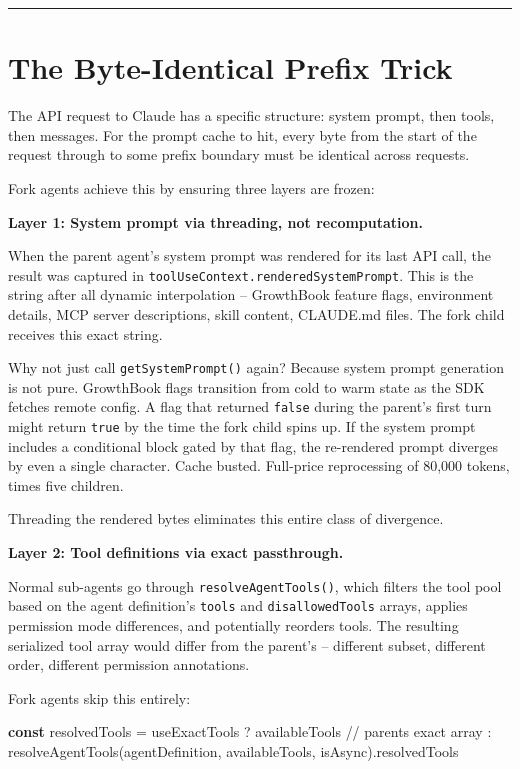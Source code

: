 \documentclass[
  english,
  11pt,
  letterpaper,
]{book}
\newenvironment{Shaded}{\begin{snugshade}}{\end{snugshade}}
\newcommand{\AttributeTok}[1]{\textcolor[rgb]{0.40,0.45,0.13}{#1}}
\newcommand{\CommentTok}[1]{\textcolor[rgb]{0.37,0.37,0.37}{#1}}
\newcommand{\FunctionTok}[1]{\textcolor[rgb]{0.28,0.35,0.67}{#1}}
\newcommand{\KeywordTok}[1]{\textcolor[rgb]{0.00,0.23,0.31}{\textbf{#1}}}
\newcommand{\NormalTok}[1]{\textcolor[rgb]{0.00,0.23,0.31}{#1}}
\newcommand{\OperatorTok}[1]{\textcolor[rgb]{0.37,0.37,0.37}{#1}}
\begin{document}
\begin{center}\rule{0.5\linewidth}{0.5pt}\end{center}

\section{The Byte-Identical Prefix
Trick}\label{the-byte-identical-prefix-trick}

The API request to Claude has a specific structure: system prompt, then
tools, then messages. For the prompt cache to hit, every byte from the
start of the request through to some prefix boundary must be identical
across requests.

Fork agents achieve this by ensuring three layers are frozen:

\textbf{Layer 1: System prompt via threading, not recomputation.}

When the parent agent's system prompt was rendered for its last API
call, the result was captured in
\texttt{toolUseContext.renderedSystemPrompt}. This is the string after
all dynamic interpolation -- GrowthBook feature flags, environment
details, MCP server descriptions, skill content, CLAUDE.md files. The
fork child receives this exact string.

Why not just call \texttt{getSystemPrompt()} again? Because system
prompt generation is not pure. GrowthBook flags transition from cold to
warm state as the SDK fetches remote config. A flag that returned
\texttt{false} during the parent's first turn might return \texttt{true}
by the time the fork child spins up. If the system prompt includes a
conditional block gated by that flag, the re-rendered prompt diverges by
even a single character. Cache busted. Full-price reprocessing of 80,000
tokens, times five children.

Threading the rendered bytes eliminates this entire class of divergence.

\textbf{Layer 2: Tool definitions via exact passthrough.}

Normal sub-agents go through \texttt{resolveAgentTools()}, which filters
the tool pool based on the agent definition's \texttt{tools} and
\texttt{disallowedTools} arrays, applies permission mode differences,
and potentially reorders tools. The resulting serialized tool array
would differ from the parent's -- different subset, different order,
different permission annotations.

Fork agents skip this entirely:

\begin{Shaded}
\begin{Highlighting}[]
\KeywordTok{const}\NormalTok{ resolvedTools }\OperatorTok{=}\NormalTok{ useExactTools}
  \OperatorTok{?}\NormalTok{ availableTools  }\CommentTok{// parent\textquotesingle{}s exact array}
  \OperatorTok{:} \FunctionTok{resolveAgentTools}\NormalTok{(agentDefinition}\OperatorTok{,}\NormalTok{ availableTools}\OperatorTok{,}\NormalTok{ isAsync)}\OperatorTok{.}\AttributeTok{resolvedTools}
\end{Highlighting}
\end{Shaded}
\end{document}
